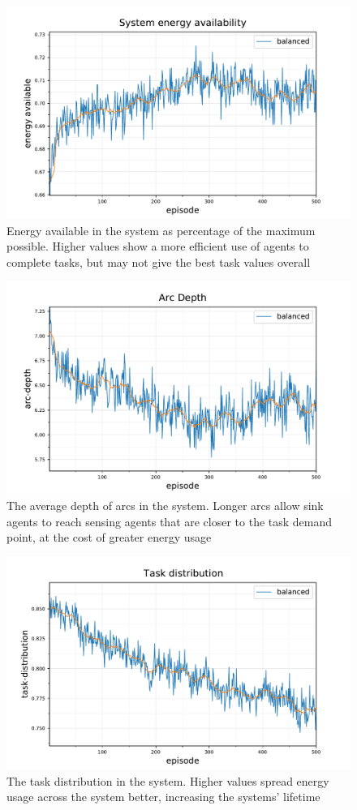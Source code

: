 \begin{figure}[ht]
	\centering
	\includegraphics[width=0.8\linewidth]{5_ctv-statistics-energy-available}
	\captionsetup{labelfont=bf,singlelinecheck=on}
	\caption{Energy available in the \simulationSimple{}{} system as percentage of the maximum possible. Higher values show a more efficient use of agents to complete tasks, but may not give the best task values overall}
	\label{fig:5_ctv-statistics-energy-available}
\end{figure}
\begin{figure}[ht]
	\centering
	\includegraphics[width=0.8\linewidth]{5_ctv-arc-depth}
	\captionsetup{labelfont=bf,singlelinecheck=on}
	\caption{The average depth of arcs in the \simulationSimple{}{} system. Longer arcs allow sink agents to reach sensing agents that are closer to the task demand point, at the cost of greater energy usage}
	\label{fig:5_ctv-arc-depth}
\end{figure}
\begin{figure}[ht]
	\centering
	\includegraphics[width=0.8\linewidth]{5_ctv-task-distribution}
	\captionsetup{labelfont=bf,singlelinecheck=on}
	\caption{The task distribution in the system. Higher values spread energy usage across the system better, increasing the systems' lifetime}
	\label{fig:5_ctv-task-distribution}
\end{figure}

